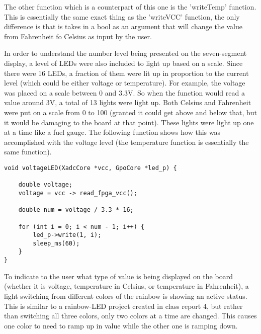 \documentclass[11pt]{article}
\begin{document}
\quad The other function which is a counterpart of this one is the 'writeTemp' function. This is essentially the same exact thing as the 'writeVCC' function, the only difference is that is takes in a bool as an argument that will change the value from Fahrenheit fo Celsius as input by the user. 

\newpage
\quad In order to understand the number level being presented on the seven-segment display, a level of LEDs were also included to light up based on a scale. Since there were 16 LEDs, a fraction of them were lit up in proportion to the current level (which could be either voltage or temperature). For example, the voltage was placed on a scale between 0 and 3.3V. So when the function would read a value around 3V, a total of 13 lights were light up. Both Celsius and Fahrenheit were put on a scale from 0 to 100 (granted it could get above and below that, but it would be damaging to the board at that point). These lights were light up one at a time like a fuel gauge. The following function shows how this was accomplished with the voltage level (the temperature function is essentially the same function).  

\begin{lstlisting}[style=CStyle, caption = Volage LED Light-up Function]
void voltageLED(XadcCore *vcc, GpoCore *led_p) {

	double voltage;
	voltage = vcc -> read_fpga_vcc();
	
	double num = voltage / 3.3 * 16;
	
	for (int i = 0; i < num - 1; i++) {
		led_p->write(1, i);
		sleep_ms(60);
	}
}
\end{lstlisting}

\quad To indicate to the user what type of value is being displayed on the board (whether it is voltage, temperature in Celsius, or temperature in Fahrenheit),  a light switching from different colors of the rainbow is showing an active status. This is similar to a rainbow-LED project created in class report 4, but rather than switching all three colors, only two colors at a time are changed. This causes one color to need to ramp up in value while the other one is ramping down. 
\end{document}
